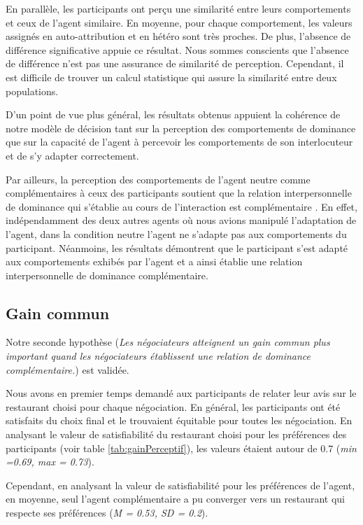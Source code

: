 	En parallèle, les participants ont perçu une similarité entre leurs comportements et ceux de l'agent similaire. En moyenne, pour chaque comportement, les valeurs assignés en auto-attribution et en hétéro sont très proches. De plus, l'absence de différence significative appuie ce résultat. Nous sommes conscients que l'absence de différence n'est pas une assurance de similarité de perception. Cependant, il est difficile de trouver un calcul statistique qui assure la similarité entre deux populations.
	
	D’un point de vue plus général, les résultats obtenus appuient la cohérence de notre modèle de décision tant sur la perception des comportements de dominance que sur la capacité de l'agent à percevoir les comportements de son interlocuteur et de s'y adapter correctement.  
	
	Par ailleurs, la perception des comportements de l'agent neutre comme complémentaires à ceux des participants soutient que la relation interpersonnelle de dominance qui s'établie au cours de l'interaction est complémentaire \cite{burgoonnonverbal}. En effet, indépendamment des deux autres agents où nous avions manipulé l'adaptation de l'agent, dans la condition neutre l'agent ne s'adapte pas aux comportements du participant. Néanmoins, les résultats démontrent que le participant s'est adapté aux comportements exhibés par l'agent et a ainsi établie une relation interpersonnelle de dominance complémentaire.
	
	\subsection{Gain commun}
	Notre seconde hypothèse (\textit{Les négociateurs atteignent un gain commun plus important quand les négociateurs établissent une relation de dominance complémentaire.}) est validée. 
	
	Nous avons en premier temps demandé aux participants de relater leur avis sur le restaurant choisi pour chaque négociation.
	En général, les participants ont été satisfaits du choix final et le trouvaient équitable pour toutes les négociation. 
	En analysant le valeur de satisfiabilité du restaurant choisi pour les préférences des participants (voir table \ref{tab:gainPerceptif}), les valeurs étaient autour de 0.7 (\emph{min =0.69, max = 0.73}). 
	
	Cependant, en analysant la valeur de satisfiabilité pour les préférences de l'agent,  en moyenne, seul l'agent complémentaire a pu converger vers un restaurant qui respecte ses préférences (\emph{M = 0.53, SD = 0.2}). 
	
